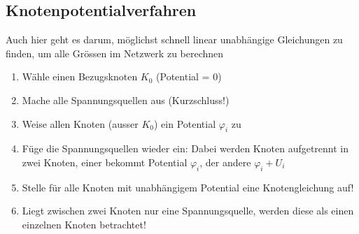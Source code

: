 					\subsection{Knotenpotentialverfahren}
					Auch hier geht es darum, möglichst schnell linear unabhängige Gleichungen zu finden, um alle Grössen im Netzwerk zu berechnen
					\beginip
					\begin{enumerate}
						\item  Wähle einen Bezugsknoten $K_0$ (Potential = 0)
						\item Mache alle Spannungsquellen aus (Kurzschluss!)
						\item Weise allen Knoten (ausser $K_0$) ein Potential $\varphi_i$ zu
						\item Füge die Spannungsquellen wieder ein: Dabei werden Knoten aufgetrennt in zwei Knoten, einer bekommt Potential $\varphi_i$, der andere $\varphi_i + U_i$
						\item Stelle für alle Knoten mit unabhängigem Potential eine Knotengleichung auf!
						\item Liegt zwischen zwei Knoten nur eine Spannungsquelle, werden diese als einen einzelnen Knoten betrachtet!

					\end{enumerate}
					\begin{center}
					\end{center}
					\iend
